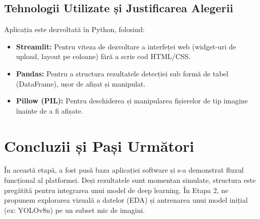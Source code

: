 \documentclass[12pt,a4paper]{article}
\begin{document}
\subsection{Tehnologii Utilizate și Justificarea Alegerii}
Aplicația este dezvoltată în Python, folosind:
\begin{itemize}
    \item \textbf{Streamlit:} Pentru viteza de dezvoltare a interfeței web (widget-uri de upload, layout pe coloane) fără a scrie cod HTML/CSS.
    \item \textbf{Pandas:} Pentru a structura rezultatele detecției sub formă de tabel (DataFrame), ușor de afișat și manipulat.
    \item \textbf{Pillow (PIL):} Pentru deschiderea și manipularea fișierelor de tip imagine înainte de a fi afișate.
\end{itemize}

\section{Concluzii și Pași Următori}
În această etapă, a fost pusă baza aplicației software și s-a demonstrat fluxul funcțional al platformei. Deși rezultatele sunt momentan simulate, structura este pregătită pentru integrarea unui model de deep learning.
În Etapa 2, ne propunem explorarea vizuală a datelor (EDA) și antrenarea unui model inițial (ex: YOLOv8n) pe un subset mic de imagini.
\end{document}
